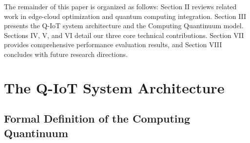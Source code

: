 \documentclass[lettersize,journal]{IEEEtran}
\begin{document}
The remainder of this paper is organized as follows: Section II reviews related work in edge-cloud optimization and quantum computing integration. Section III presents the Q-IoT system architecture and the Computing Quantinuum model. Sections IV, V, and VI detail our three core technical contributions. Section VII provides comprehensive performance evaluation results, and Section VIII concludes with future research directions.

\section{The Q-IoT System Architecture}
\label{sec:architecture}


\subsection{Formal Definition of the Computing Quantinuum}
\label{subsec:quantinuum_def}
\end{document}
